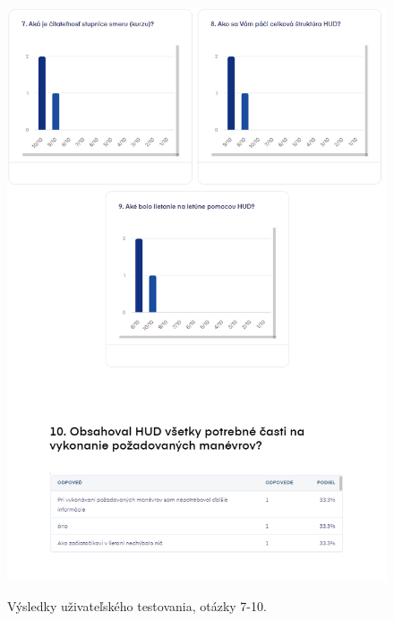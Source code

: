 \begin{figure}[ht]
\centering
\includegraphics[scale=0.65]{obrazky-figures/dotaznik1.2n.png}
\caption{Výsledky uživateľského testovania, otázky 7-10.}{\label{dotaznik2.1}}
\end{figure}

